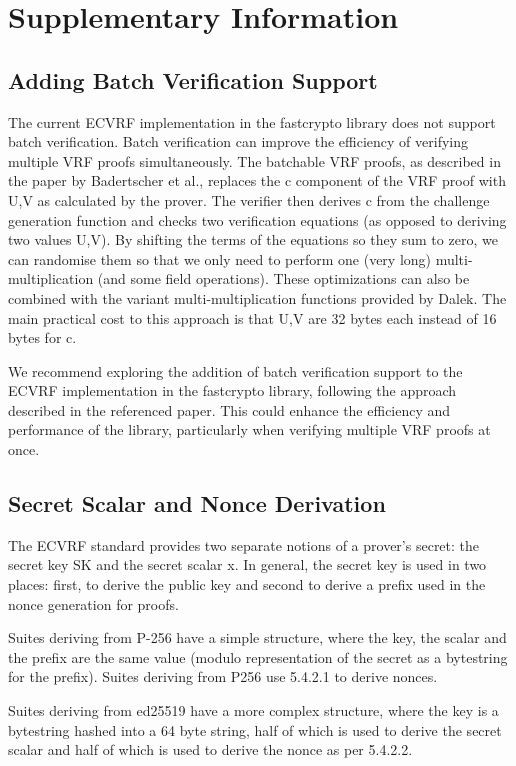 \section{Supplementary Information}
\subsection{Adding Batch Verification Support}
The current ECVRF implementation in the fastcrypto library does not support batch verification. Batch verification can improve the efficiency of verifying multiple VRF proofs simultaneously. The batchable VRF proofs, as described in the paper by Badertscher et al.\cite{batch-ecvrf}, replaces the c component of the VRF proof with U,V as calculated by the prover. The verifier then derives c from the challenge generation function and checks two verification equations (as opposed to deriving two values U,V). By shifting the terms of the equations so they sum to zero, we can randomise them so that we only need to perform one (very long) multi-multiplication (and some field operations). These optimizations can also be combined with the variant multi-multiplication functions provided by Dalek. The main practical cost to this approach is that U,V are 32 bytes each instead of 16 bytes for c.

We recommend exploring the addition of batch verification support to the ECVRF implementation in the fastcrypto library, following the approach described in the referenced paper. This could enhance the efficiency and performance of the library, particularly when verifying multiple VRF proofs at once.

\subsection{Secret Scalar and Nonce Derivation}
The ECVRF standard provides two separate notions of a prover’s secret: the secret key SK and the secret scalar x. In general, the secret key is used in two places: first, to derive the public key and second to derive a prefix used in the nonce generation for proofs.

Suites deriving from P-256 have a simple structure, where the key, the scalar and the prefix are the same value (modulo representation of the secret as a bytestring for the prefix). Suites deriving from P256 use 5.4.2.1 to derive nonces.

Suites deriving from ed25519 have a more complex structure, where the key is a bytestring hashed into a 64 byte string, half of which is used to derive the secret scalar and half of which is used to derive the nonce as per 5.4.2.2.

